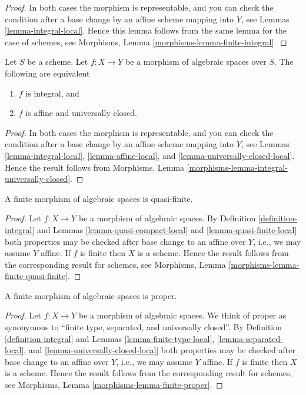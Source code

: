 \begin{proof}
In both cases the morphism is representable, and you can check the condition
after a base change by an affine scheme mapping into $Y$, see
Lemmas \ref{lemma-integral-local}. Hence this lemma follows from the
same lemma for the case of schemes, see
Morphisms, Lemma \ref{morphisms-lemma-finite-integral}.
\end{proof}

\begin{lemma}
\label{lemma-integral-universally-closed}
Let $S$ be a scheme.
Let $f : X \to Y$ be a morphism of algebraic spaces over $S$.
The following are equivalent
\begin{enumerate}
\item $f$ is integral, and
\item $f$ is affine and universally closed.
\end{enumerate}
\end{lemma}

\begin{proof}
In both cases the morphism is representable, and you can check the condition
after a base change by an affine scheme mapping into $Y$, see
Lemmas \ref{lemma-integral-local},
\ref{lemma-affine-local}, and
\ref{lemma-universally-closed-local}.
Hence the result follows from
Morphisms, Lemma \ref{morphisms-lemma-integral-universally-closed}.
\end{proof}

\begin{lemma}
\label{lemma-finite-quasi-finite}
A finite morphism of algebraic spaces is quasi-finite.
\end{lemma}

\begin{proof}
Let $f : X \to Y$ be a morphism of algebraic spaces.
By
Definition \ref{definition-integral}
and
Lemmas \ref{lemma-quasi-compact-local} and
\ref{lemma-quasi-finite-local}
both properties may be checked after base change to an affine over $Y$,
i.e., we may assume $Y$ affine.
If $f$ is finite then $X$ is a scheme.
Hence the result follows from the corresponding result for schemes, see
Morphisms, Lemma \ref{morphisms-lemma-finite-quasi-finite}.
\end{proof}

\begin{lemma}
\label{lemma-finite-proper}
A finite morphism of algebraic spaces is proper.
\end{lemma}

\begin{proof}
Let $f : X \to Y$ be a morphism of algebraic spaces.
We think of proper as synonymous to
``finite type, separated, and universally closed''.
By
Definition \ref{definition-integral}
and
Lemmas \ref{lemma-finite-type-local},
\ref{lemma-separated-local}, and
\ref{lemma-universally-closed-local}
both properties may be checked after base change to an affine over $Y$,
i.e., we may assume $Y$ affine.
If $f$ is finite then $X$ is a scheme.
Hence the result follows from the corresponding result for schemes, see
Morphisms, Lemma \ref{morphisms-lemma-finite-proper}.
\end{proof}





